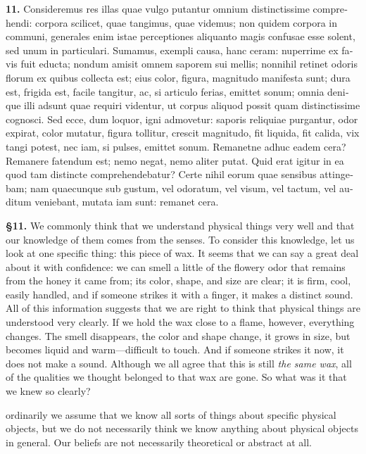 \beginnumbering
\pstart
\begin{latin}
    \textenglish{\textbf{11.}} Consideremus res illas quae vulgo putantur omnium distinctissime comprehendi: corpora scilicet, quae tangimus, quae videmus; non quidem corpora in communi, generales enim istae perceptiones aliquanto magis confusae esse solent, sed unum in particulari. Sumamus, exempli causa, hanc ceram: nuperrime ex favis fuit educta; nondum amisit omnem saporem sui mellis; nonnihil retinet odoris florum ex quibus collecta est; eius color, figura, magnitudo manifesta sunt; dura est, frigida est, facile tangitur, ac, si articulo ferias, emittet sonum; omnia denique illi adsunt quae requiri videntur, ut corpus aliquod possit quam distinctissime cognosci. Sed ecce, dum loquor, igni admovetur: saporis reliquiae purgantur, odor expirat, color mutatur, figura tollitur, crescit magnitudo, fit liquida, fit calida, vix tangi potest, nec iam, si pulses, emittet sonum. Remanetne adhuc eadem cera? Remanere fatendum est; nemo negat, nemo aliter putat. Quid erat igitur in ea quod tam distincte comprehendebatur? Certe nihil eorum quae sensibus attingebam; nam quaecunque sub gustum, vel odoratum, vel visum, vel tactum, vel auditum veniebant, mutata iam sunt: remanet cera.
\end{latin}
\pend
\endnumbering

\prenotes

\textbf{§11.} We commonly think that we understand physical things very well and that our knowledge of them comes from the senses. To consider this knowledge, let us look at one specific thing: this piece of wax. It seems that we can say a great deal about it with confidence: we can smell a little of the flowery odor that remains from the honey it came from; its color, shape, and size are clear; it is firm, cool, easily handled, and if someone strikes it with a finger, it makes a distinct sound. All of this information suggests that we are right to think that physical things are understood very clearly. If we hold the wax close to a flame, however, everything changes. The smell disappears, the color and shape change, it grows in size, but becomes liquid and warm---difficult to touch. And if someone strikes it now, it does not make a sound. Although we all agree that this is still \textit{the same wax}, all of the qualities we thought belonged to that wax are gone. So what was it that we knew so clearly?

 ordinarily we assume that we know all sorts of things about specific physical objects, but we do not necessarily think we know anything about physical objects in general. Our beliefs are not necessarily theoretical or abstract at all.

